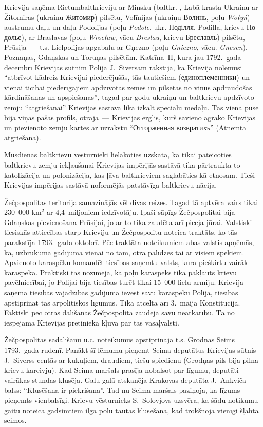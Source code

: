 \documentclass[twoside,a5paper,12pt,fleqn,openany]{extbook}
\newcommand{\pltxti}[1]{\textit{\textpolish{#1}}}
\newcommand{\rutxti}[1]{\textrussian{#1}}
\newcommand{\detxti}[1]{\textit{\textgerman{#1}}}
\newcommand{\betxti}[1]{\textbelarusian{#1}}
\newcommand{\uktxti}[1]{\textukrainian{#1}}
\begin{document}
Krievija saņēma Rietumbaltkrieviju ar Minsku (baltkr. \betxti{Мінск)}, Labā krasta Ukrainu ar Žitomiras (ukraiņu \uktxti{Житомир}) pilsētu, Volīnijas (ukraiņu \uktxti{Волинь}, poļu \pltxti{Wołyń}) austrumu daļu un daļu Podolijas (poļu \pltxti{Podole}, ukr. \uktxti{Поділля}, \uktxti{Podilla}, krievu \rutxti{Подолье}), ar Braslavas (poļu \pltxti{Wrocław}, vācu \detxti{Breslau}, krievu \rutxti{Бреславль}) pilsētu, Prūsija~--- t.s. Lielpolijas apgabalu ar Gņezno (poļu \pltxti{Gniezno}, vācu. \detxti{Gnesen}), Poznaņas, Gdaņskas un Toruņas pilsētām. Katrīna~II, kura jau 1792.~gada decembrī Krievijas sūtnim Polijā J.~Siversam rakstīja, ka Krievija nolēmusi ``atbrīvot kādreiz Krievijai piederējušās, tās tautiešiem (\rutxti{единоплеменники}) un vienai ticībai piederīgajiem apdzīvotās zemes un pilsētas no viņus apdraudošās kārdināšanas un apspiešanas'', tagad par godu ukraiņu un baltkrievu apdzīvoto zemju ``atgriešanai'' Krievijas sastāvā lika izkalt speciālu medaļu. Tās viena pusē bija viņas pašas profils, otrajā~--- Krievijas ērglis, kurš savieno agrāko Krievijas un pievienoto zemju kartes ar uzrakstu ``\rutxti{Отторженная возвратихъ}'' (Atņemtā atgriešana).

Mūsdienās baltkrievu vēsturnieki lielākoties uzskata, ka tikai pateicoties baltkrievu zemju iekļaušanai Krievijas impērijās sastāvā tika pārtraukta to katolizācija un polonizācija, kas ļāva baltkrieviem saglabāties kā etnosam. Tieši Krievijas impērijas sastāvā noformējās patstāvīga baltkrievu nācija.

Žečpospolitas teritorija samazinājās vēl divas reizes. Tagad tā aptvēra vairs tikai 230~000 km$^{2}$ ar 4,4~miljoniem iedzīvotāju. Īpaši sāpīgs Žečpospolitai bija Gdaņskas pievienošana Prūsijai, jo ar to tika zaudēta arī pieeja jūrai. Valstiski-tiesiskās attiecības starp Krieviju un Žečpospolitu noteica traktāts, ko tās parakstīja 1793.~gada oktobrī. Pēc traktāta noteikumiem abas valstis apņēmās, ka, uzbrukuma gadījumā vienai no tām, otra palīdzēs tai ar visiem spēkiem. Apvienoto karaspēku komandēt tiesības saņemtu valsts, kura piešķirtu vairāk karaspēka. Praktiski tas nozīmēja, ka poļu karaspēks tika pakļauts krievu pavēlniecībai, jo Polijai bija tiesības turēt tikai 15~000 lielu armiju. Krievija saņēma tiesības vajadzības gadījumā ievest savu karaspēku Polijā, tiesības apstiprināt tās ārpolitiskos līgumus. Tika atcelta arī 3.~maija Konstitūcija. Faktiski pēc otrās dalīšanas Žečpospolita zaudēja savu neatkarību. Tā no iespējamā Krievijas pretinieka kļuva par tās vasaļvalsti.

Žečpospolitas sadalīšanu u.c. noteikumus apstiprināja t.s. Grodņas Seims 1793.~gada rudenī. Panākt šī lēmumu pieņemt Seima deputātus Krievijas sūtnis J.~Siverss centās ar kukuļiem, draudiem, tiešu spiedienu (Grodņas pils bija pilna krievu kareivju). Kad Seima maršals prasīja nobalsot par līgumu, deputāti vairākas stundas klusēja. Galu galā atskanēja Krakovas deputāta J.~Ankviča balss: ``Klusēšana ir piekrišana''. Tad nu Seima maršals paziņoja, ka līgums pieņemts vienbalsīgi. Krievu vēsturnieks S.~Solovjovs uzsvēra, ka šādu notikumu gaitu noteica gadsimtiem ilgā poļu tautas klusēšana, kad trokšņoja vienīgi šļahta seimos.
\end{document}
